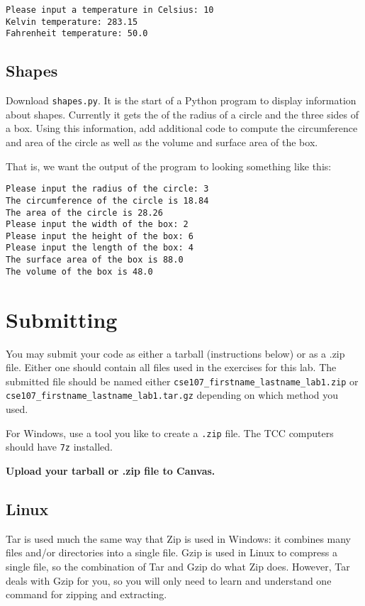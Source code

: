 \documentclass[12pt,hidelinks]{article}
\begin{document}
\begin{lstlisting}[style=bash]
Please input a temperature in Celsius: 10
Kelvin temperature: 283.15
Fahrenheit temperature: 50.0
\end{lstlisting}

\subsection{Shapes}
Download \texttt{shapes.py}. It is the start of a Python program to display information about shapes. Currently it gets the of the radius of a circle and the three sides of a box. Using this information, add additional code to compute the circumference and area of the circle as well as the volume and surface area of the box.

That is, we want the output of the program to looking something like this:

\begin{lstlisting}[style=bash]
Please input the radius of the circle: 3
The circumference of the circle is 18.84
The area of the circle is 28.26
Please input the width of the box: 2
Please input the height of the box: 6
Please input the length of the box: 4
The surface area of the box is 88.0
The volume of the box is 48.0
\end{lstlisting}

\pagebreak
\section{Submitting}

You may submit your code as either a tarball (instructions below) or as a .zip file. Either one should contain all files used in the exercises for this lab. The submitted file should be named either \texttt{cse107\_firstname\_lastname\_lab1.zip} or \texttt{cse107\_firstname\_lastname\_lab1.tar.gz} depending on which method you used.

For Windows, use a tool you like to create a \texttt{.zip} file. The TCC computers should
have \texttt{7z} installed.

\begin{center}
  \textbf{Upload your tarball or .zip file to Canvas.}
\end{center}

\subsection{Linux}

Tar is used much the same way that Zip is used in Windows: it combines many files and/or directories into a single file. Gzip is used in Linux to compress a single file, so the combination of Tar and Gzip do what Zip does. However, Tar deals with Gzip for you, so you will only need to learn and understand one command for zipping and extracting.
\end{document}
